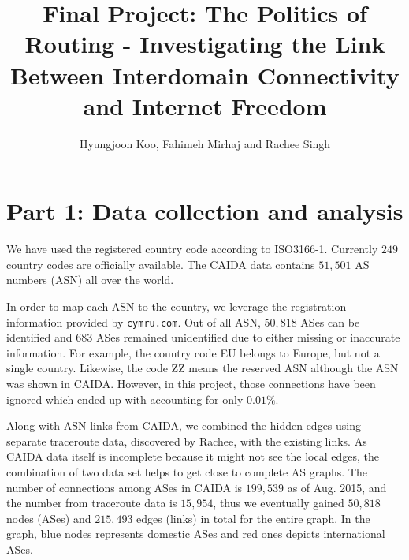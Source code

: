 \documentclass{article}
\begin{document}
\title{Final Project: The Politics of Routing - Investigating the Link Between
Interdomain Connectivity and Internet Freedom}
\author{Hyungjoon Koo, Fahimeh Mirhaj and Rachee Singh}
\maketitle

\section*{Part 1: Data collection and analysis}

\bigskip

\noindent 
We have used the registered country code according to ISO3166-1. Currently $249$
country codes are officially available. The CAIDA data contains $51,501$ AS
numbers (ASN) all over the world. 
\bigskip

\noindent 
In order to map each ASN to the country, we leverage the registration
information provided by \texttt{cymru.com}. Out of all ASN, $50,818$ ASes can be
identified and $683$ ASes remained unidentified due to either missing or
inaccurate information. For example, the country code EU belongs to Europe, but
not a single country. Likewise, the code ZZ means the reserved ASN although the
ASN was shown in CAIDA. However, in this project, those connections have been
ignored which ended up with accounting for only $0.01\%$.
\bigskip

\noindent 
Along with ASN links from CAIDA, we combined the hidden edges using separate
traceroute data, discovered by Rachee, with the existing links. As CAIDA data itself is
incomplete because it might not see the local edges, the combination of two data
set helps to get close to complete AS graphs. The number of connections among
ASes in CAIDA is $199,539$ as of Aug. 2015, and the number from traceroute data 
is $15,954$, thus we eventually gained $50,818$ nodes (ASes) and $215,493$ edges 
(links) in total for the entire graph. In the graph, blue nodes represents 
domestic ASes and red ones depicts international ASes.
\end{document}
